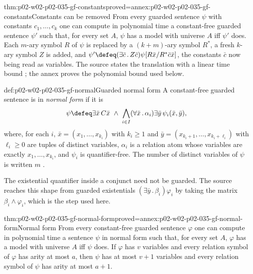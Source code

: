 \begin{hblemma}{thm:p02-w02-p02-035-gf-constants}{proved=annex:p02-w02-p02-035-gf-constants}{Constants can be removed}
From every guarded sentence \(\psi\) with constants \(c_1,\ldots,c_k\) one can
compute in polynomial time a constant-free guarded sentence \(\psi'\) such that,
for every set \(A\), \(\psi\) has a model with universe \(A\) iff \(\psi'\)
does.  Each \(m\)-ary symbol \(R\) of \(\psi\) is replaced by a
\((k+m)\)-ary symbol \(R^{*}\), a fresh \(k\)-ary symbol \(Z\) is added, and
\(\psi'\defeq(\exists\bar c\,.\,Z\bar c)\psi[R\bar x/R^{*}\bar c\bar x]\), the
constants \(\bar c\) now being read as variables.  The source states the
translation with a linear time bound \cite[lem.~2.3]{Gradel1999}; the annex
proves the polynomial bound used below.
\end{hblemma}

\begin{hbdefinition}{def:p02-w02-p02-035-gf-normal}{Guarded normal form}
A constant-free guarded sentence is in \emph{normal form} if it is
\[
 \psi\defeq\exists\bar x\,C\bar x\ \land\
 \bigwedge_{i\in I}(\forall\bar x\,.\,\alpha_i)\exists\bar y\,\psi_i(\bar x,\bar y),
\]
where, for each \(i\), \(\bar x=(x_1,\ldots,x_{k_i})\) with \(k_i\geq1\) and
\(\bar y=(x_{k_i+1},\ldots,x_{k_i+\ell_i})\) with \(\ell_i\geq0\) are tuples of
distinct variables, \(\alpha_i\) is a relation atom whose variables are
exactly \(x_1,\ldots,x_{k_i}\), and \(\psi_i\) is quantifier-free.  The
number of distinct variables of \(\psi\) is written \(m\)
\cite[lem.~3.1 and the remark after it]{Gradel1999}.
\end{hbdefinition}

The existential quantifier inside a conjunct need not be guarded.  The source
reaches this shape from guarded existentials \((\exists\bar y\,.\,\beta_i)\varphi_i\)
by taking the matrix \(\beta_i\land\varphi_i\), which is the step used here.

\begin{hblemma}{thm:p02-w02-p02-035-gf-normal-form}{proved=annex:p02-w02-p02-035-gf-normal-form}{Normal form}
From every constant-free guarded sentence \(\varphi\) one can compute in
polynomial time a sentence \(\psi\) in normal form such that, for every set
\(A\), \(\varphi\) has a model with universe \(A\) iff \(\psi\) does.  If
\(\varphi\) has \(v\) variables and every relation symbol of \(\varphi\) has
arity at most \(a\), then \(\psi\) has at most \(v+1\) variables and every
relation symbol of \(\psi\) has arity at most \(a+1\).
\end{hblemma}

